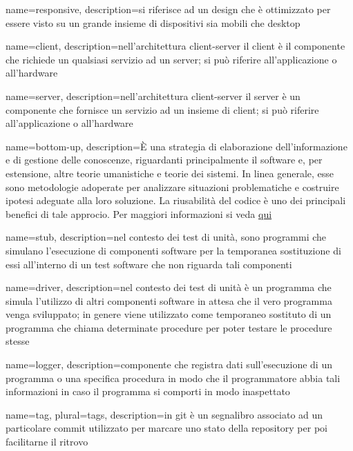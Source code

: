  {
	name=responsive,
	description={si riferisce ad un design che è ottimizzato per essere visto su un grande insieme di dispositivi sia mobili che desktop}
}

 {
	name=client,
	description={nell'architettura client-server il client è il componente che richiede un qualsiasi servizio ad un server; si può riferire all'applicazione o all'hardware}
}

 {
	name=server,
	description={nell'architettura client-server il server è un componente che fornisce un servizio ad un insieme di client; si può riferire all'applicazione o all'hardware}
}

 {
	name=bottom-up,
	description={È una strategia di elaborazione dell'informazione e di gestione delle conoscenze, riguardanti principalmente il software e, per estensione, altre teorie umanistiche e teorie dei sistemi. In linea generale, esse sono metodologie adoperate per analizzare situazioni problematiche e costruire ipotesi adeguate alla loro soluzione. La riusabilità del codice è uno dei principali benefici di tale approcio. Per maggiori informazioni si veda \href{https://it.wikipedia.org/wiki/Progettazione_top-down_e_bottom-up}{qui}}
}

 {
	name=stub,
	description={nel contesto dei test di unità, sono programmi che simulano l'esecuzione di componenti software per la temporanea sostituzione di essi all'interno di un test software che non riguarda tali componenti}
}

 {
    name=driver,
    description={nel contesto dei test di unità è un programma che simula l'utilizzo di altri componenti software in attesa che il vero programma venga sviluppato; in genere viene utilizzato come temporaneo sostituto di un programma che chiama determinate procedure per poter testare le procedure stesse}
}

 {
    name=logger,
    description={componente che registra dati sull'esecuzione di un programma o una specifica procedura in modo che il programmatore abbia tali informazioni in caso il programma si comporti in modo inaspettato}
}

 {
    name=tag,
    plural=tags,
    description={in git è un segnalibro associato ad un particolare commit utilizzato per marcare uno stato della repository per poi facilitarne il ritrovo}
}

